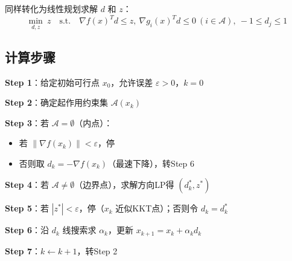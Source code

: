 同样转化为线性规划求解 $d$ 和 $z$：
\[
\min_{d, z}\ z\quad \text{s.t.}\quad \nabla f(x)^T d \leq z,\ \nabla g_i(x)^T d \leq 0\ (i \in \mathcal{A}),\ -1 \leq d_j \leq 1
\]

\subsection{计算步骤}

\begin{algobox}[可行方向法计算步骤]
\textbf{Step 1}：给定初始可行点 $x_0$，允许误差 $\varepsilon > 0$，$k = 0$

\textbf{Step 2}：确定起作用约束集 $\mathcal{A}(x_k)$

\textbf{Step 3}：若 $\mathcal{A} = \emptyset$（内点）：
\begin{itemize}
    \item 若 $\|\nabla f(x_k)\| < \varepsilon$，停
    \item 否则取 $d_k = -\nabla f(x_k)$（最速下降），转Step 6
\end{itemize}

\textbf{Step 4}：若 $\mathcal{A} \neq \emptyset$（边界点），求解方向LP得 $(d_k^*, z^*)$

\textbf{Step 5}：若 $|z^*| < \varepsilon$，停（$x_k$ 近似KKT点）；否则令 $d_k = d_k^*$

\textbf{Step 6}：沿 $d_k$ 线搜索求 $\alpha_k$，更新 $x_{k+1} = x_k + \alpha_k d_k$

\textbf{Step 7}：$k \leftarrow k+1$，转Step 2
\end{algobox}

